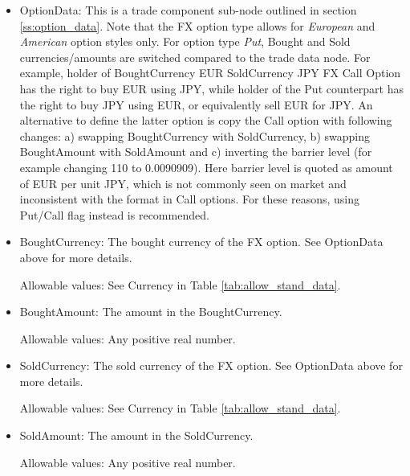 \begin{itemize}
\item OptionData: This is a trade component sub-node outlined in section \ref{ss:option_data}. Note that the
  FX option type allows for \emph{European} and \emph{American} option styles only. For option type \emph{Put}, Bought and Sold currencies/amounts are switched compared to the trade data node.
For example, holder of BoughtCurrency EUR SoldCurrency JPY FX Call Option has the right to buy EUR using JPY, while
holder of the Put counterpart has the right to buy JPY using EUR, or equivalently sell EUR for JPY. An alternative to define the latter option is copy the Call option with following changes:
a) swapping BoughtCurrency with SoldCurrency, b) swapping BoughtAmount with SoldAmount and c) inverting the barrier level (for example changing 110 to 0.0090909). Here barrier level is
quoted as amount of EUR per unit JPY, which is not commonly seen on market and inconsistent with the format in Call options. For these reasons, using Put/Call flag instead is recommended.

\item BoughtCurrency: The bought currency of the FX option. See OptionData above for more details.

Allowable values:  See Currency in Table \ref{tab:allow_stand_data}.

\item BoughtAmount: The amount in the BoughtCurrency.  

Allowable values:  Any positive real number.

\item SoldCurrency: The sold currency of the FX option. See OptionData above for more details.

Allowable values:  See Currency in Table \ref{tab:allow_stand_data}.

\item SoldAmount: The amount in the SoldCurrency.  

Allowable values:  Any positive real number.

\end{itemize}

